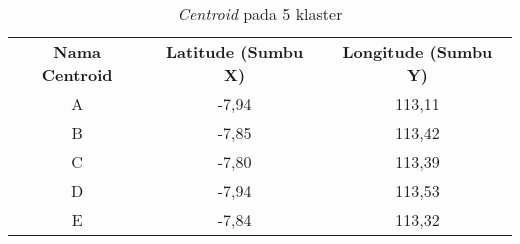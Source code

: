 \begin{table}[H]
\footnotesize
\centering
\begin{tabular}{ccc}
\rowcolor[HTML]{4472C4} 
{\color[HTML]{FFFFFF} \textbf{Nama   Centroid}} & {\color[HTML]{FFFFFF} \textbf{Latitude (Sumbu X)}} & {\color[HTML]{FFFFFF} \textbf{Longitude (Sumbu Y)}} \\
\rowcolor[HTML]{D9E1F2} 
A & -7,94 & 113,11 \\
B & -7,85 & 113,42 \\
\rowcolor[HTML]{D9E1F2} 
C & -7,80 & 113,39 \\
D & -7,94 & 113,53 \\
\rowcolor[HTML]{D9E1F2} 
E & -7,84 & 113,32
\end{tabular}
\caption{\textit{Centroid} pada 5 klaster}
\label{tab:center5}
\end{table}